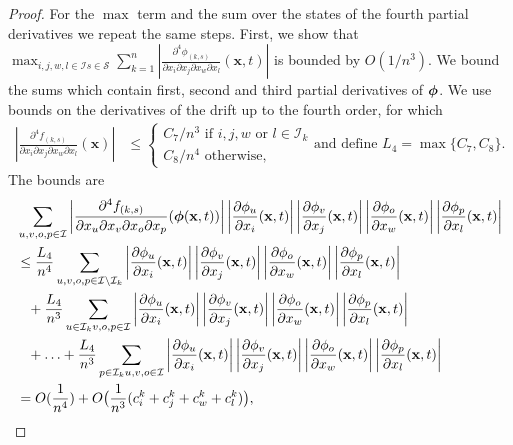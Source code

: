 \documentclass[acmsmall]{acmart}
\newcommand\bx{\mathbf{x}}
\newcommand\bphi{\text{\boldmath$\phi$}}
\newcommand\calI{\mathcal{I}}
\newcommand\calS{\mathcal{S}}
\newcommand\abs[1]{\left|#1\right|}         %
\newcommand{\dddd}[5]{ \frac{\partial^4 #1 }{ \partial x_{#2} \partial x_{#3} \partial x_{#4} \partial x_{#5} }}
\begin{document}
\begin{proof}
For the $\max$ term and the sum over the states of the fourth partial derivatives we repeat the same steps. First, we show that $\max_{i,j,w,l \in \calI s\in \calS} \sum_{k=1}^{n} \abs{\dddd{\phi_{(k,s)}}{i}{j}{w}{l}(\bx,t)}$ is bounded by $O(1/n^3)$. We bound the sums which contain first, second and third partial derivatives of $\bphi$. We use bounds on the derivatives of the drift up to the fourth order, for which \color{myorange}
\begin{align*}
\abs{\dddd{f_{(k,s)}}{i}{j}{w}{l}(\bx)} & \leq 
\begin{cases}
C_7/n^3 \text{ if } i,j,w \text{ or } l \in \calI_k \\
C_8/n^4 \text{ otherwise,}
\end{cases} 
\text{and define } L_4 = \max\{C_7,C_8 \}.
\end{align*}
The bounds are
\begin{align*}
& \sum_{u,v,o,p\in \calI} \abs{\dddd{f_{(k,s)}}{u}{v}{o}{p}(\bphi (\bx,t))} \abs{\frac{\partial \phi_{u}}{\partial x_i}(\bx,t)} \abs{\frac{\partial \phi_{v}}{\partial x_j}(\bx,t)} \abs{\frac{\partial \phi_{o}}{\partial x_w}(\bx,t)} \abs{\frac{\partial \phi_{p}}{\partial x_l}(\bx,t)} \\
& \leq \frac{L_4}{n^4} \sum_{u,v,o,p\in \calI \setminus \calI_k} \abs{\frac{\partial \phi_{u}}{\partial x_i}(\bx,t)} \abs{\frac{\partial \phi_{v}}{\partial x_j}(\bx,t)} \abs{\frac{\partial \phi_{o}}{\partial x_w}(\bx,t)} \abs{\frac{\partial \phi_{p}}{\partial x_l}(\bx,t)} \\
& \phantom{\leq} + \frac{L_4}{n^3}\sum_{u \in \calI_k v,o,p \in \calI}  \abs{\frac{\partial \phi_{u}}{\partial x_i}(\bx,t)} \abs{\frac{\partial \phi_{v}}{\partial x_j}(\bx,t)} \abs{\frac{\partial \phi_{o}}{\partial x_w}(\bx,t)} \abs{\frac{\partial \phi_{p}}{\partial x_l}(\bx,t)} \\
& \phantom{\leq} + \hdots + \frac{L_4}{n^3}\sum_{p \in \calI_k u,v,o \in \calI} \abs{\frac{\partial \phi_{u}}{\partial x_i}(\bx,t)} \abs{\frac{\partial \phi_{v}}{\partial x_j}(\bx,t)} \abs{\frac{\partial \phi_{o}}{\partial x_w}(\bx,t)} \abs{\frac{\partial \phi_{p}}{\partial x_l}(\bx,t)} \\
& = O(\frac{1}{n^4}) + O\bigl(\frac{1}{n^3}(c^k_i + c^k_j + c^k_w + c^k_l)\bigr),
\end{align*}


\end{proof}
\end{document}
